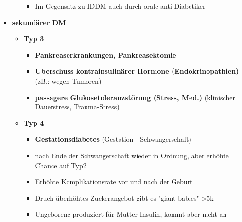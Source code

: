 \begin{itemize}
\begin{itemize}
\begin{itemize}
\begin{itemize}
								\end{itemize}
							\item Im Gegensatz zu IDDM auch durch orale anti-Diabetiker
						\end{itemize}
				\end{itemize}
\pagebreak
			\item \textbf{sekundärer DM}
				\begin{itemize}
					\item \textbf{Typ 3}
						\begin{itemize}
							\item \textbf{Pankreaserkrankungen, Pankreasektomie}
							\item \textbf{Überschuss kontrainsulinärer Hormone (Endokrinopathien)} (zB.: wegen Tumoren)
							\item \textbf{passagere Glukosetoleranzstörung (Stress, Med.)} (klinischer Dauerstress, Trauma-Stress)
						\end{itemize}
					\item \textbf{Typ 4}
						\begin{itemize}
							\item \textbf{Gestationsdiabetes} (Gestation - Schwangerschaft)
							\item nach Ende der Schwangerschaft wieder in Ordnung, aber erhöhte Chance auf Typ2
							\item Erhöhte Komplikationsrate vor und nach der Geburt
							\item Druch überhöhtes Zuckerangebot gibt es "giant babies" >5k
							\item Ungeborene produziert für Mutter Insulin, kommt aber nicht an
						\end{itemize}
				\end{itemize}
		\end{itemize}
